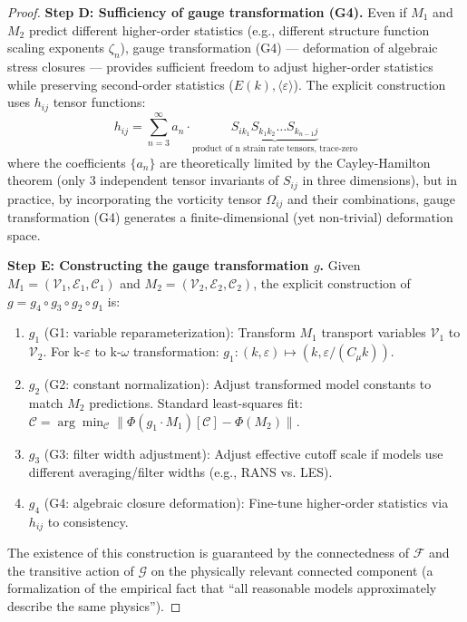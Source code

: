 \documentclass[12pt,a4paper]{article}
\theoremstyle{plain}
\theoremstyle{definition}
\theoremstyle{remark}
\newcommand{\F}{\mathcal{F}}
\newcommand{\G}{\mathcal{G}}
\newcommand{\eps}{\varepsilon}
\newcommand{\avg}[1]{\langle #1 \rangle}
\begin{document}
\begin{proof}
\textbf{Step D: Sufficiency of gauge transformation (G4).} Even if $M_1$ and $M_2$ predict different higher-order statistics (e.g., different structure function scaling exponents $\zeta_n$), gauge transformation (G4) --- deformation of algebraic stress closures --- provides sufficient freedom to adjust higher-order statistics while preserving second-order statistics ($E(k), \avg{\eps}$). The explicit construction uses $h_{ij}$ tensor functions:
\begin{equation}
h_{ij} = \sum_{n=3}^{\infty} a_n \cdot \underbrace{S_{ik_1}S_{k_1k_2}\dots S_{k_{n-1}j}}_{\text{product of n strain rate tensors, trace-zero}}
\end{equation}
where the coefficients $\{a_n\}$ are theoretically limited by the Cayley-Hamilton theorem (only 3 independent tensor invariants of $S_{ij}$ in three dimensions), but in practice, by incorporating the vorticity tensor $\Omega_{ij}$ and their combinations, gauge transformation (G4) generates a finite-dimensional (yet non-trivial) deformation space.

\textbf{Step E: Constructing the gauge transformation $g$.} Given $M_1=(\mathcal{V}_1,\mathcal{E}_1,\mathcal{C}_1)$ and $M_2=(\mathcal{V}_2,\mathcal{E}_2,\mathcal{C}_2)$, the explicit construction of $g = g_4\circ g_3\circ g_2\circ g_1$ is:
\begin{enumerate}
    \item $g_1$ (G1: variable reparameterization): Transform $M_1$ transport variables $\mathcal{V}_1$ to $\mathcal{V}_2$. For k-$\eps$ to k-$\omega$ transformation: $g_1: (k,\eps) \mapsto (k, \eps/(C_\mu k))$.
    \item $g_2$ (G2: constant normalization): Adjust transformed model constants to match $M_2$ predictions. Standard least-squares fit: $\mathcal{C} = \arg\min_{\mathcal{C}} \|\Phi(g_1\cdot M_1)[\mathcal{C}] - \Phi(M_2)\|$.
    \item $g_3$ (G3: filter width adjustment): Adjust effective cutoff scale if models use different averaging/filter widths (e.g., RANS vs. LES).
    \item $g_4$ (G4: algebraic closure deformation): Fine-tune higher-order statistics via $h_{ij}$ to consistency.
\end{enumerate}
The existence of this construction is guaranteed by the connectedness of $\F$ and the transitive action of $\G$ on the physically relevant connected component (a formalization of the empirical fact that ``all reasonable models approximately describe the same physics'').


\end{proof}
\end{document}
